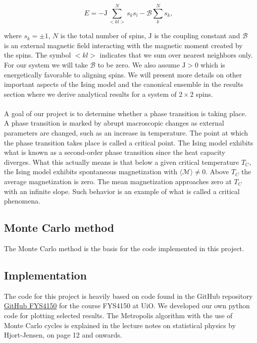 \documentclass[a4paper, fontsize=11pt]{article}
\begin{document}
\begin{equation}
E = -\text{J} \sum^N_{<kl>} s_{k} s_{l} - \mathcal{B} \sum^N_{k} s_{k},
\end{equation}

where $s_{k}= \pm 1$, $N$ is the total number of spins, $\text{J}$ is the coupling constant and $\mathcal{B}$ is an external magnetic field interacting with the magnetic moment created by the spins. The symbol $<kl>$ indicates that we sum over nearest neighbors only. For our system we will take $\mathcal{B}$ to be zero. We also assume $\text{J}>0$ which is energetically favorable to aligning spins. We will present more details on other important aspects of the Ising model and the canonical ensemble in the results section where we derive analytical results for a system of $2 \times 2$ spins. 

\paragraph{}
A goal of our project is to determine whether a phase transition is taking place. A phase transition is marked by abrupt macroscopic changes as external parameters are changed, such as an increase in temperature. The point at which the phase transition takes place is called a critical point. The Ising model exhibits what is known as a second-order phase transition since the heat capacity diverges. What this actually means is that below a given critical temperature $T_{C}$, the Ising model exhibits spontaneous magnetization with $\langle \mathcal{M} \rangle \neq 0$. Above $T_{C}$ the average magnetization is zero. The mean magnetization approaches zero at $T_{C}$ with an infinite slope. Such behavior is an example of what is called a critical phenomena. \cite{statphys}

\subsection{Monte Carlo method}
The Monte Carlo method is the basis for the code implemented in this project. 



\subsection{Implementation}
The code for this project is heavily based on code found in the GitHub repository \href{https://github.com/CompPhysics/ComputationalPhysics}{GitHub FYS4150} for the course FYS4150 at UiO. We developed our own python code for plotting selected results. The Metropolis algorithm with the use of Monte Carlo cycles is explained in the lecture notes on statistical physics by Hjort-Jensen, on page 12 and onwards. \cite{statphys}
\end{document}
